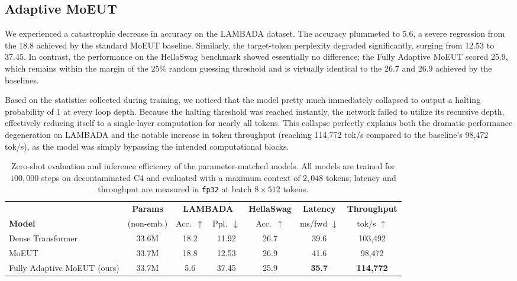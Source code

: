 \documentclass[11pt]{article}
\begin{document}
\subsection{Adaptive MoEUT}
We experienced a catastrophic decrease in accuracy on the LAMBADA dataset.
The accuracy plummeted to 5.6, a severe regression from the 18.8 achieved by the standard MoEUT baseline.
Similarly, the target-token perplexity degraded significantly, surging from 12.53 to 37.45.
In contrast, the performance on the HellaSwag benchmark showed essentially no difference; the Fully Adaptive MoEUT scored 25.9, which remains within the margin of the $25\%$ random guessing threshold and is virtually identical to the 26.7 and 26.9 achieved by the baselines.

Based on the statistics collected during training, we noticed that the model pretty much immediately collapsed to output a halting probability of 1 at every loop depth.
Because the halting threshold was reached instantly, the network failed to utilize its recursive depth, effectively reducing itself to a single-layer computation for nearly all tokens.
This collapse perfectly explains both the dramatic performance degeneration on LAMBADA and the notable increase in token throughput (reaching 114,772 tok/s compared to the baseline's 98,472 tok/s), as the model was simply bypassing the intended computational blocks.

\begin{table}[t]
  \centering
  \small
  \begin{tabular}{lcccccc}
    \toprule
    & \textbf{Params} & \multicolumn{2}{c}{\textbf{LAMBADA}} & \textbf{HellaSwag}
    & \textbf{Latency} & \textbf{Throughput} \\
    \cmidrule(lr){3-4}
    \textbf{Model} & (non-emb.) & Acc.\ $\uparrow$ & Ppl.\ $\downarrow$
    & Acc.\ $\uparrow$ & ms/fwd $\downarrow$ & tok/s $\uparrow$ \\
    \midrule
    Dense Transformer & 33.6M & 18.2 & 11.92 & 26.7 & 39.6 & 103{,}492 \\
    MoEUT             & 33.7M & 18.8 & 12.53 & 26.9 & 41.6 & 98{,}472 \\
    \midrule
    Fully Adaptive MoEUT (ours) & 33.7M & 5.6 & 37.45 & 25.9 & \textbf{35.7} & \textbf{114{,}772} \\
    \bottomrule
  \end{tabular}
  \caption{Zero-shot evaluation and inference efficiency of the parameter-matched
  models. All models are trained for $100{,}000$ steps on decontaminated
  C4 and evaluated with a maximum context of $2{,}048$ tokens; latency and
  throughput are measured in \texttt{fp32} at batch $8\times512$ tokens. }
  \label{tab:baselines}
\end{table}
\end{document}
